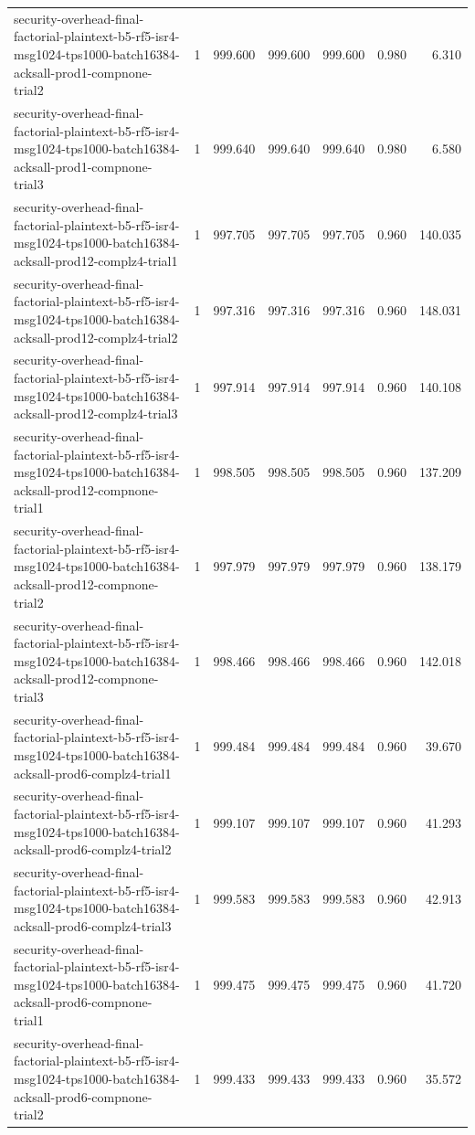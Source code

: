 \begin{tabular}{lrrrrrr}
security-overhead-final-factorial-plaintext-b5-rf5-isr4-msg1024-tps1000-batch16384-acksall-prod1-compnone-trial2 & 1 & 999.600 & 999.600 & 999.600 & 0.980 & 6.310 \\
security-overhead-final-factorial-plaintext-b5-rf5-isr4-msg1024-tps1000-batch16384-acksall-prod1-compnone-trial3 & 1 & 999.640 & 999.640 & 999.640 & 0.980 & 6.580 \\
security-overhead-final-factorial-plaintext-b5-rf5-isr4-msg1024-tps1000-batch16384-acksall-prod12-complz4-trial1 & 1 & 997.705 & 997.705 & 997.705 & 0.960 & 140.035 \\
security-overhead-final-factorial-plaintext-b5-rf5-isr4-msg1024-tps1000-batch16384-acksall-prod12-complz4-trial2 & 1 & 997.316 & 997.316 & 997.316 & 0.960 & 148.031 \\
security-overhead-final-factorial-plaintext-b5-rf5-isr4-msg1024-tps1000-batch16384-acksall-prod12-complz4-trial3 & 1 & 997.914 & 997.914 & 997.914 & 0.960 & 140.108 \\
security-overhead-final-factorial-plaintext-b5-rf5-isr4-msg1024-tps1000-batch16384-acksall-prod12-compnone-trial1 & 1 & 998.505 & 998.505 & 998.505 & 0.960 & 137.209 \\
security-overhead-final-factorial-plaintext-b5-rf5-isr4-msg1024-tps1000-batch16384-acksall-prod12-compnone-trial2 & 1 & 997.979 & 997.979 & 997.979 & 0.960 & 138.179 \\
security-overhead-final-factorial-plaintext-b5-rf5-isr4-msg1024-tps1000-batch16384-acksall-prod12-compnone-trial3 & 1 & 998.466 & 998.466 & 998.466 & 0.960 & 142.018 \\
security-overhead-final-factorial-plaintext-b5-rf5-isr4-msg1024-tps1000-batch16384-acksall-prod6-complz4-trial1 & 1 & 999.484 & 999.484 & 999.484 & 0.960 & 39.670 \\
security-overhead-final-factorial-plaintext-b5-rf5-isr4-msg1024-tps1000-batch16384-acksall-prod6-complz4-trial2 & 1 & 999.107 & 999.107 & 999.107 & 0.960 & 41.293 \\
security-overhead-final-factorial-plaintext-b5-rf5-isr4-msg1024-tps1000-batch16384-acksall-prod6-complz4-trial3 & 1 & 999.583 & 999.583 & 999.583 & 0.960 & 42.913 \\
security-overhead-final-factorial-plaintext-b5-rf5-isr4-msg1024-tps1000-batch16384-acksall-prod6-compnone-trial1 & 1 & 999.475 & 999.475 & 999.475 & 0.960 & 41.720 \\
security-overhead-final-factorial-plaintext-b5-rf5-isr4-msg1024-tps1000-batch16384-acksall-prod6-compnone-trial2 & 1 & 999.433 & 999.433 & 999.433 & 0.960 & 35.572 \\

\end{tabular}
